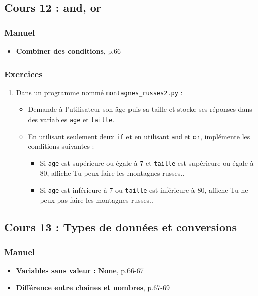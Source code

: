 \documentclass[11pt]{article}
\begin{document}
\subsection*{Cours 12 : and, or}
\label{chapitre4_cours12}
\subsubsection*{Manuel}
\label{sec:orgaf4e743}
\begin{itemize}
\item \textbf{\og Combiner des conditions\fg{}}, p.66
\end{itemize}
\subsubsection*{Exercices}
\label{sec:orgfb2c659}
\begin{enumerate}
\item Dans un programme nommé \texttt{montagnes\_russes2.py} :
\begin{itemize}
\item Demande à l'utilisateur son âge puis sa taille et stocke ses réponses dans des variables \texttt{age} et \texttt{taille}.
\item En utilisant seulement deux \texttt{if} et en utilisant \texttt{and} et \texttt{or}, implémente les conditions suivantes :
\begin{itemize}
\item Si \texttt{age} est supérieure ou égale à 7 et \texttt{taille} est supérieure ou égale à 80, affiche \og Tu peux faire les montagnes russes.\fg{}.
\item Si \texttt{age} est inférieure à 7 ou \texttt{taille} est inférieure à 80, affiche \og Tu ne peux pas faire les montagnes russes.\fg{}.
\end{itemize}
\end{itemize}
\end{enumerate}

\subsection*{Cours 13 : Types de données et conversions}
\label{chapitre4_cours13}
\subsubsection*{Manuel}
\label{sec:orge5d637a}
\begin{itemize}
\item \textbf{\og Variables sans valeur : None\fg{}}, p.66-67
\item \textbf{\og Différence entre chaînes et nombres\fg{}}, p.67-69
\end{itemize}
\end{document}
